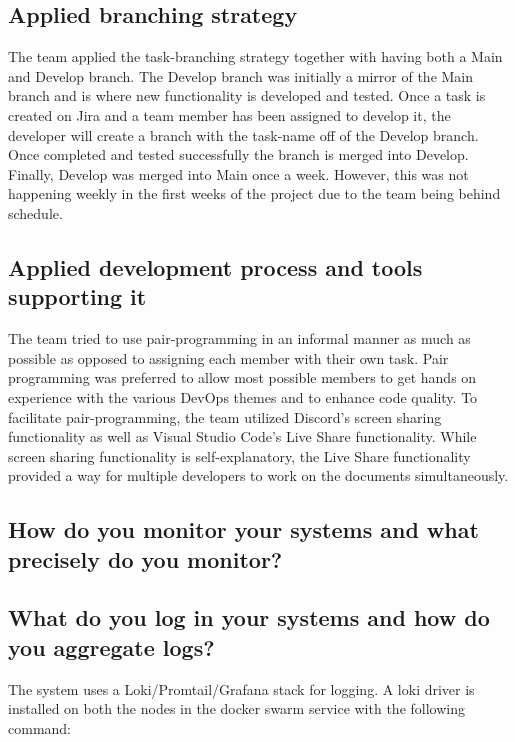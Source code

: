 \subsection{Applied branching strategy}
The team applied the task-branching strategy\cite{branching} together with having both a Main and Develop branch. The Develop branch was initially a mirror of the Main branch and is where new functionality is developed and tested. Once a task is created on Jira and a team member has been assigned to develop it, the developer will create a branch with the task-name off of the Develop branch. Once completed and tested successfully the branch is merged into Develop. Finally, Develop was merged into Main once a week. However, this was not happening weekly in the first weeks of the project due to the team being behind schedule. 

\subsection{Applied development process and tools supporting it}
The team tried to use pair-programming in an informal manner as much as possible as opposed to assigning each member with their own task. Pair programming was preferred to allow most possible members to get hands on experience with the various DevOps themes and to enhance code quality. To facilitate pair-programming, the team utilized Discord's screen sharing functionality as well as Visual Studio Code's Live Share functionality\cite{live_share}. While screen sharing functionality is self-explanatory, the Live Share functionality provided a way for multiple developers to work on the documents simultaneously. 

\subsection{How do you monitor your systems and what precisely do you monitor?}


\subsection{What do you log in your systems and how do you aggregate logs?}
The system uses a Loki/Promtail/Grafana stack for logging. A loki driver is installed on both the nodes in the docker swarm service with the following command:

